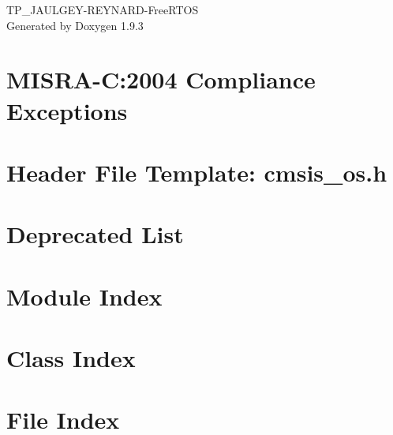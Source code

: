 \documentclass[twoside]{book}
\newcommand{\+}{\discretionary{\mbox{\scriptsize$\hookleftarrow$}}{}{}}
\newcommand{\clearemptydoublepage}{%
    \newpage{\pagestyle{empty}\cleardoublepage}%
  }
\begin{document}
  \raggedbottom
    \hypersetup{pageanchor=false,
                bookmarksnumbered=true,
                pdfencoding=unicode
               }
  \begin{titlepage}
  \vspace*{7cm}
  \begin{center}%
  {\Large TP\+\_\+\+JAULGEY-\/\+REYNARD-\/\+Free\+RTOS}\\
  \vspace*{1cm}
  {\large Generated by Doxygen 1.9.3}\\
  \end{center}
  \end{titlepage}
  \clearemptydoublepage
  \tableofcontents
  \clearemptydoublepage
  \hypersetup{pageanchor=true}
\chapter{MISRA-\/C\+:2004 Compliance Exceptions}
\label{_c_m_s_i_s__m_i_s_r_a__exceptions}

\chapter{Header File Template\+: cmsis\+\_\+os.\+h}
\label{cmsis_os_h}

\chapter{Deprecated List}
\label{deprecated}

\chapter{Module Index}

\chapter{Class Index}

\chapter{File Index}

\end{document}
